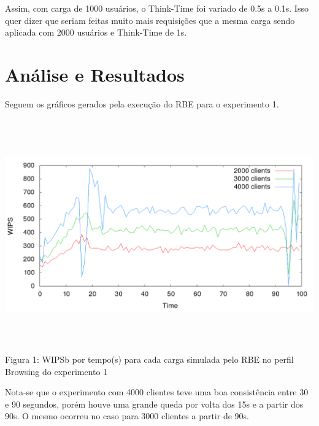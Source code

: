\documentclass[11pt,twoside]{article}
\begin{document}
Assim, com carga de 1000 usuários, o Think-Time foi variado de 0.5s a 0.1s. Isso quer dizer que seriam feitas muito mais requisições que a mesma carga sendo aplicada com 2000 usuários e Think-Time de 1s.

\section{An\'alise e Resultados}
\setlength{\parindent}{4ex}

Seguem os gráficos gerados pela execução do RBE para o experimento 1.
\begin{center}
\includegraphics[width=15cm, height=10cm]{images/exp1/plot_browsin}
Figura 1: WIPSb por tempo(s) para cada carga simulada pelo RBE no perfil Browsing do experimento 1
\end{center}
Nota-se que o experimento com 4000 clientes teve uma boa consistência entre 30 e 90 segundos, porém houve uma grande queda por volta dos 15s e a partir dos 90s. O mesmo ocorreu no caso para 3000 clientes a partir de 90s.
\end{document}
